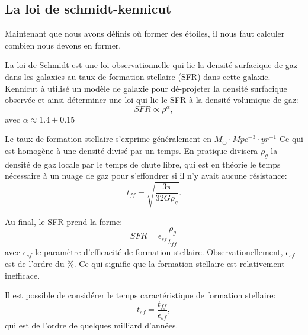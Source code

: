 
\subsection{La loi de schmidt-kennicut}

Maintenant que nous avons définis où former des étoiles, il nous faut calculer combien nous devons en former.

La loi de Schmidt \citep{1959ApJ...129..243S}  est une loi observationnelle qui lie la densité surfacique de gaz dans les galaxies au taux de formation stellaire (\ac{SFR}) dans cette galaxie.
Kennicut \citep{1998ApJ...498..541K} à utilisé un modèle de galaxie pour dé-projeter la densité surfacique observée et ainsi déterminer une loi qui lie le \ac{SFR} à la densité volumique de gaz:
\begin{equation}
SFR \propto \rho ^{\alpha},
\end{equation}
avec $\alpha \approx 1.4 \pm 0.15$

Le taux de formation stellaire s'exprime généralement en $M_\odot \cdot Mpc^{-3}  \cdot yr^{-1}$  
Ce qui est homogène à une densité divisé par un temps.
En pratique divisera $\rho_g$ la densité de gaz locale par le temps de chute libre, qui est en théorie le temps nécessaire à un nuage de gaz pour s'effondrer si il n'y avait aucune résistance:
\begin{equation}
t_{ff} = \sqrt{\frac{3\pi}{32G\rho_g}}.
\end{equation}

Au final, le \ac{SFR} prend la forme:
\begin{equation}
	SFR = \epsilon_{sf} \frac{\rho_g}{t_{ff}}
    \label{eq_sfr}
\end{equation}
avec  $\epsilon_{sf}$ le paramètre d'efficacité de formation stellaire.
Observationellement, $\epsilon_{sf}$  est de l'ordre du \%. %
Ce qui signifie que la formation stellaire est relativement inefficace.

Il est possible de considérer le temps caractéristique de formation stellaire:
\begin{equation}
t_{sf} =  \frac{t_{ff}}{ \epsilon_{sf} },
\end{equation}
qui est de l'ordre de quelques milliard d'années.

